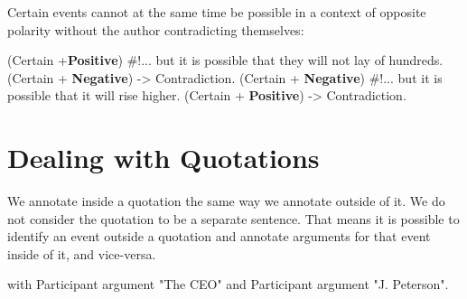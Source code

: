 Certain events cannot at the same time be possible in a context of opposite polarity without the author contradicting themselves:
\begin{exe}
    \ex {} (Certain +\textbf{Positive})
        \expl \#!... but it is possible that they will not lay of hundreds. (Certain + \textbf{Negative}) -> Contradiction.
    \ex {} (Certain + \textbf{Negative})
        \expl \#!... but it is possible that it will rise higher. (Certain + \textbf{Positive}) -> Contradiction.
\end{exe}


\section{Dealing with Quotations}

We annotate inside a quotation the same way we annotate outside of it. We do not consider the quotation to be a separate sentence. That means it is possible to identify an event outside a quotation and annotate arguments for that event inside of it, and vice-versa.

\begin{exe}
    \ex {}
        \expl {} with  Participant argument "The CEO" and  Participant argument "J. Peterson".
\end{exe}